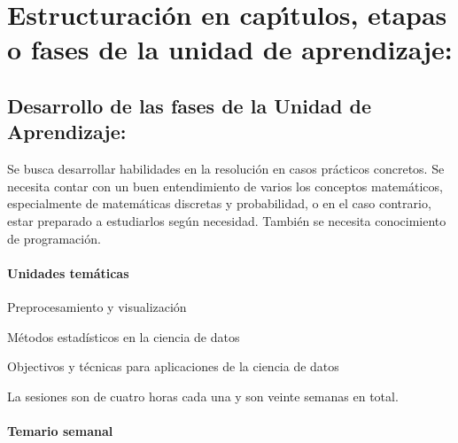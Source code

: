 \section{Estructuraci\'{o}n en cap\'{\i}tulos, etapas o fases de la unidad de
  aprendizaje:}

\subsection{Desarrollo de las fases de la Unidad de Aprendizaje:}

\quad

Se busca desarrollar habilidades en la resoluci\'{o}n en casos
pr\'{a}cticos concretos. Se necesita contar con un buen entendimiento
de varios los conceptos matem\'{a}ticos, especialmente de
matem\'{a}ticas discretas y probabilidad, o en el caso contrario,
estar preparado a estudiarlos seg\'{u}n necesidad. Tambi\'{e}n se
necesita conocimiento de programaci\'{o}n.

\paragraph{Unidades tem\'{a}ticas}

\begin{description}[itemsep=-2pt]
\item[U1]{Preprocesamiento y visualizaci\'{o}n}
\item[U2]{M\'{e}todos estad\'{i}sticos en la ciencia de datos}
\item[U3]{Objectivos y t\'{e}cnicas para aplicaciones de la ciencia de datos}
\end{description}

La sesiones son de cuatro horas cada una y son veinte semanas en
total.

\newpage

\paragraph{Temario semanal}

